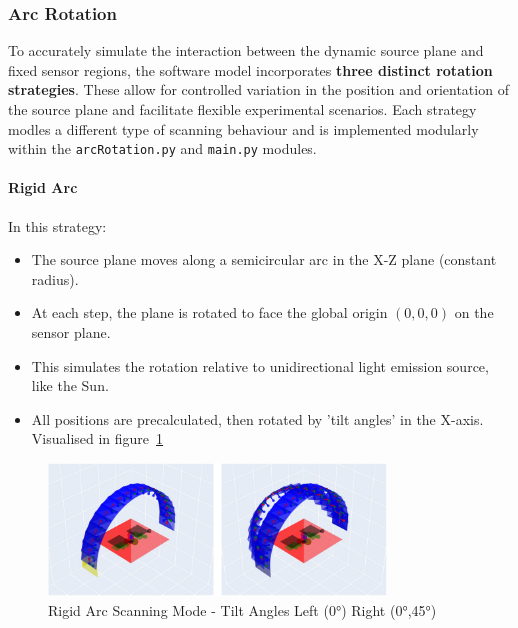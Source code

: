 \subsubsection{Arc Rotation}
To accurately simulate the interaction between the dynamic source plane and fixed sensor regions, the software model incorporates \textbf{three distinct rotation strategies}. These allow for controlled variation in the position and orientation of the source plane and facilitate flexible experimental scenarios.
Each strategy modles a different type of scanning behaviour and is implemented modularly within the \texttt{arcRotation.py} and \texttt{main.py} modules.

\paragraph{Rigid Arc}

In this strategy:
\begin{itemize}
    \item The source plane moves along a semicircular arc in the X-Z plane (constant radius).
    \item At each step, the plane is rotated to face the global origin $(0,0,0)$ on the sensor plane.
    \item This simulates the rotation relative to unidirectional light emission source, like the Sun. 
    \item All positions are precalculated, then rotated by 'tilt angles' in the X-axis. Visualised in figure~\ref{fig:Ridig Arc Scanning Mode}   
\end{itemize} 

\begin{figure}[htbp] %
    \centering
    \includegraphics[width=0.8\textwidth]{chapters/methodology/SoftwareModel/images/Rigid Arc.png} %
    \caption{Rigid Arc Scanning Mode - Tilt Angles Left (0°) Right (0°,45°) }       %
    \label{fig:Ridig Arc Scanning Mode}            %
\end{figure}   

